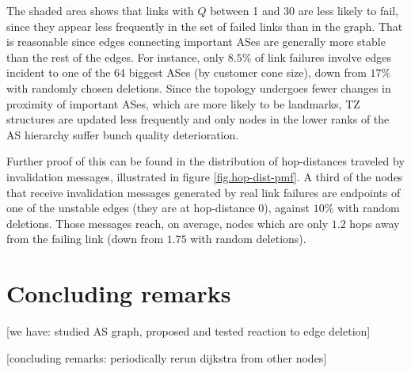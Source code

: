 \documentclass[a4paper,11pt,oneside]{report}
\newcommand{\svg}[1]{{#1}}
\begin{document}
The shaded area shows that links with $Q$ between 1 and 30 are less likely to fail, since they appear less frequently in the set of failed links than in the graph. That is reasonable since edges connecting important ASes are generally more stable than the rest of the edges.
For instance, only $8.5\%$ of link failures involve edges incident to one of the 64 biggest ASes (by customer cone size), down from $17\%$ with randomly chosen deletions. Since the topology undergoes fewer changes in proximity of important ASes, which are more likely to be landmarks, TZ structures are updated less frequently and only nodes in the lower ranks of the AS hierarchy suffer bunch quality deterioration. 

Further proof of this can be found in the distribution of hop-distances traveled by invalidation messages, illustrated in figure \ref{fig.hop-dist-pmf}. A third of the nodes that receive invalidation messages generated by real link failures are endpoints of one of the unstable edges (they are at hop-distance $0$), against $10\%$ with random deletions. Those messages reach, on average, nodes which are only $1.2$ hops away from the failing link (down from $1.75$ with random deletions).




\chapter*{Concluding remarks}
[we have: studied AS graph, proposed and tested reaction to edge deletion]

[concluding remarks: periodically rerun dijkstra from other nodes]

\cleardoublepage
{}
{}
\nocite{*}
\printbibliography
\end{document}
